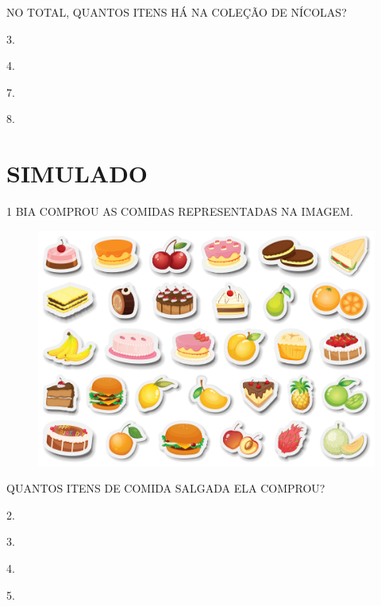 NO TOTAL, QUANTOS ITENS HÁ NA COLEÇÃO DE NÍCOLAS?

\begin{multicols}{4}
\begin{escolha}
\item 3.

\item 4.

\item 7.

\item 8.
\end{escolha}
\end{multicols}


\chapter[SIMULADO 4]{SIMULADO}

\num{1} BIA COMPROU AS COMIDAS REPRESENTADAS
NA IMAGEM.

\begin{figure}[H]
\centering
\includegraphics[width=\textwidth]{./media/SAEB_1ANO_MAT_FIGURA136.png}
\end{figure}

QUANTOS ITENS DE COMIDA SALGADA ELA COMPROU?

\begin{multicols}{4}
\begin{escolha}[itemsep=0pt]
\item 2.

\item 3.

\item 4.

\item 5.
\end{escolha}
\end{multicols}

